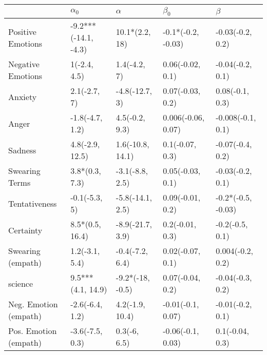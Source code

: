 \begin{tabular}{lllll}
\toprule
{} &            $\alpha_0$ &          $\alpha$ &           $\beta_0$ &             $\beta$ \\
\midrule
Positive Emotions     &  -9.2***(-14.1, -4.3) &    10.1*(2.2, 18) &  -0.1*(-0.2, -0.03) &    -0.03(-0.2, 0.2) \\
Negative Emotions     &          1(-2.4, 4.5) &      1.4(-4.2, 7) &    0.06(-0.02, 0.1) &    -0.04(-0.2, 0.1) \\
Anxiety               &          2.1(-2.7, 7) &    -4.8(-12.7, 3) &    0.07(-0.03, 0.2) &     0.08(-0.1, 0.3) \\
Anger                 &       -1.8(-4.7, 1.2) &    4.5(-0.2, 9.3) &  0.006(-0.06, 0.07) &   -0.008(-0.1, 0.1) \\
Sadness               &       4.8(-2.9, 12.5) &  1.6(-10.8, 14.1) &     0.1(-0.07, 0.3) &    -0.07(-0.4, 0.2) \\
Swearing Terms        &        3.8*(0.3, 7.3) &   -3.1(-8.8, 2.5) &    0.05(-0.03, 0.1) &    -0.03(-0.2, 0.1) \\
Tentativeness         &         -0.1(-5.3, 5) &  -5.8(-14.1, 2.5) &    0.09(-0.01, 0.2) &  -0.2*(-0.5, -0.03) \\
Certainty             &       8.5*(0.5, 16.4) &  -8.9(-21.7, 3.9) &     0.2(-0.01, 0.3) &     -0.2(-0.5, 0.1) \\
Swearing (empath)     &        1.2(-3.1, 5.4) &   -0.4(-7.2, 6.4) &    0.02(-0.07, 0.1) &    0.004(-0.2, 0.2) \\
science               &     9.5***(4.1, 14.9) &  -9.2*(-18, -0.5) &    0.07(-0.04, 0.2) &    -0.04(-0.3, 0.2) \\
Neg. Emotion (empath) &       -2.6(-6.4, 1.2) &   4.2(-1.9, 10.4) &   -0.01(-0.1, 0.07) &    -0.01(-0.2, 0.1) \\
Pos. Emotion (empath) &       -3.6(-7.5, 0.3) &      0.3(-6, 6.5) &   -0.06(-0.1, 0.03) &     0.1(-0.04, 0.3) \\
\bottomrule
\end{tabular}
